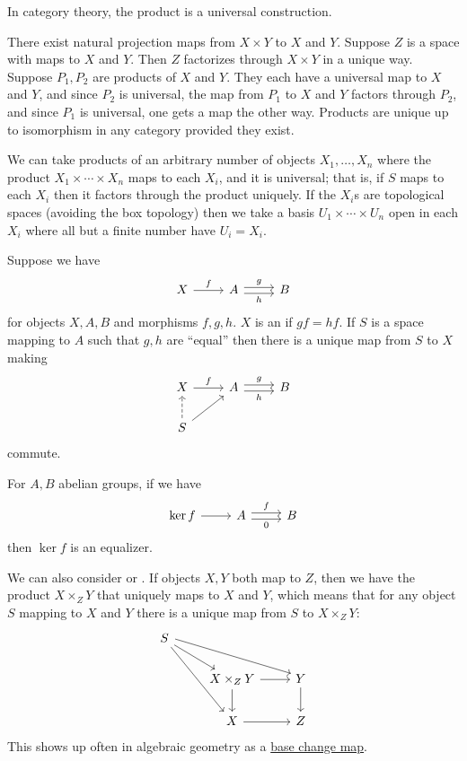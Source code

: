 \documentclass[11pt, oneside]{article}
\begin{document}
In category theory, the product is a universal construction. 

There exist natural projection maps from $X\times Y$ to $X$ and $Y$. Suppose $Z$ is a space with maps to $X$ and $Y$. Then $Z$ factorizes through $X\times Y$ in a unique way. Suppose $P_1,P_2$ are products of $X $ and $Y$. They each have a universal map to $X$ and $Y$, and since $P_2$ is universal, the map from $P_1$ to $X$ and $Y$ factors through $P_2$, and since $P_1$ is universal, one gets a map the other way. Products are unique up to isomorphism in any category provided they exist.

We can take products of an arbitrary number of objects $X_1,\hdots,X_n$ where the product $X_1\times\cdots\times X_n$ maps to each $X_i$, and it is universal; that is, if $S$ maps to each $X_i$ then it factors through the product uniquely. If the $X_i$s are topological spaces (avoiding the box topology) then we take a basis $U_1\times\cdots\times U_n$ open in each $X_i$ where all but a finite number have $U_i=X_i$.

Suppose we have
\[
\begin{tikzcd}
X\arrow[r, "f"] &A \arrow[r, shift left, "g"]\arrow[r, shift right, swap, "h"]& B
\end{tikzcd}
\]
for objects $X, A,B$ and morphisms $f,g,h$. $X$ is an \href{https://en.wikipedia.org/wiki/Equaliser_(mathematics)}{} if $gf=hf$. If $S$ is a space mapping to $A$ such that $g,h$ are ``equal'' then there is a unique map from $S$ to $X$ making 
\[
\begin{tikzcd}
X\arrow[r, "f"] &A \arrow[r, shift left, "g"]\arrow[r, shift right, swap, "h"]& B\\
S \arrow[ru] \arrow[u, dashed]
\end{tikzcd}
\]
commute. 

For $A, B$ abelian groups, if we have
\[
\begin{tikzcd}
\ker f \arrow[r] &A \arrow[r, shift left, "f"]\arrow[r, shift right, swap, "0"]& B
\end{tikzcd}
\]
then $\ker f$ is an equalizer.

We can also consider \href{https://en.wikipedia.org/wiki/Pullback_(category_theory)}{} or \href{https://en.wikipedia.org/wiki/Pullback_(category_theory)}{}. If objects $X,Y$ both map to $Z$, then we have the product $X\times_Z Y$ that uniquely maps to $X$ and $Y$, which means that for any object $S$ mapping to $X$ and $Y$ there is a unique map from $S $ to $X\times_Z Y$:
\[
\begin{tikzcd}
S \arrow [dr] \arrow[drr, shift left] \arrow[ddr] &&\\
&X\times_Z Y \arrow[r] \arrow[d]& Y\arrow[d]\\
& X\arrow[r]&Z
\end{tikzcd}
\]
This shows up often in algebraic geometry as a \href{https://en.wikipedia.org/wiki/Base_change_theorems}{\color{black}base change map}.
\end{document}
